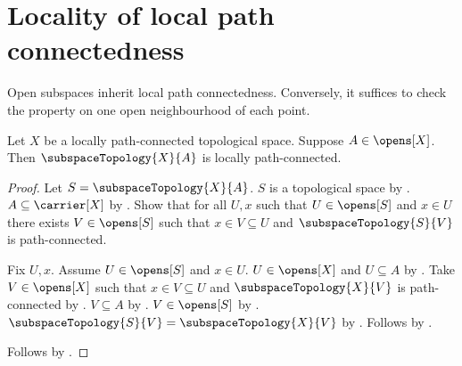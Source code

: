 \section{Locality of local path connectedness}



Open subspaces inherit local path connectedness. Conversely, it suffices to
check the property on one open neighbourhood of each point.

\begin{theorem}\label{open_subspace_is_locally_path_connected}
    Let $X$ be a locally path-connected topological space.
    Suppose $A\in\opens[X]$.
    Then $\subspaceTopology{X}{A}$ is locally path-connected.
\end{theorem}
\begin{proof}
    Let $S=\subspaceTopology{X}{A}$.
    $S$ is a topological space by .
    $A\subseteq\carrier[X]$ by .
    Show that for all $U,x$ such that $U\in\opens[S]$ and $x\in U$ there exists
        $V\in\opens[S]$ such that $x\in V\subseteq U$ and
        $\subspaceTopology{S}{V}$ is path-connected.
    \begin{subproof}
        Fix $U,x$.
        Assume $U\in\opens[S]$ and $x\in U$.
        $U\in\opens[X]$ and $U\subseteq A$ by .
        Take $V\in\opens[X]$ such that $x\in V\subseteq U$ and
            $\subspaceTopology{X}{V}$ is path-connected by .
        $V\subseteq A$ by .
        $V\in\opens[S]$ by .
        $\subspaceTopology{S}{V}=\subspaceTopology{X}{V}$ by .
        Follows by .
    \end{subproof}
    Follows by .
\end{proof}

